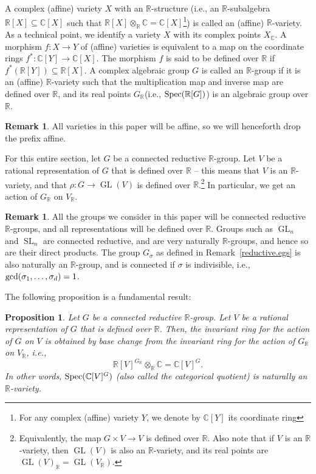 \documentclass[11pt]{amsart}
\newtheorem{proposition}[theorem]{Proposition}
\theoremstyle{definition}
\newtheorem{remark}[theorem]{Remark}
\newcommand{\R}{{\mathbb R}}
\newcommand{\C}{{\mathbb C}}
\newcommand{\GL}{\operatorname{GL}}
\newcommand{\SL}{\operatorname{SL}}
\begin{document}
A complex (affine) variety $X$ with an $\R$-structure (i.e., an $\R$-subalgebra $\R[X] \subseteq \C[X]$ such that $\R[X] \otimes_\R \C = \C[X]$\footnote{For any complex (affine) variety $Y$, we denote by $\C[Y]$ its coordinate ring}) is called an (affine) $\R$-variety. As a technical point, we identify a variety $X$ with its complex points $X_\C$. A morphism $f:X \rightarrow Y$ of (affine) varieties is equivalent to a map on the coordinate rings $f^*: \C[Y] \rightarrow \C[X]$. The morphism $f$ is said to be defined over $\R$ if $f^*(\R[Y]) \subseteq \R[X]$. A complex algebraic group $G$ is called an $\R$-group if it is an (affine) $\R$-variety such that the multiplication map and inverse map are defined over $\R$, and its real points $G_\R$(i.e., ${\rm Spec}(\R[G])$) is an algebraic group over $\R$.

\begin{remark}
All varieties in this paper will be affine, so we will henceforth drop the prefix affine.
\end{remark}

For this entire section, let $G$ be a connected reductive $\R$-group. Let $V$ be a rational representation of $G$ that is defined over $\R$ -- this means that $V$ is an $\R$-variety, and that $\rho: G \rightarrow \GL(V)$ is defined over $\R$.\footnote{Equivalently, the map $G \times V \rightarrow V$ is defined over $\R$. Also note that if $V$ is an $\R$-variety, then $\GL(V)$ is also an $\R$-variety, and its real points are $\GL(V)_\R = \GL(V_\R)$.} In particular, we get an action of $G_\R$ on $V_\R$.

\begin{remark}
All the groups we consider in this paper will be connected reductive $\R$-groups, and all representations will be defined over $\R$. Groups such as $\GL_n$ and $\SL_n$ are connected reductive, and are very naturally $\R$-groups, and hence so are their direct products. The group $G_\sigma$ as defined in Remark~\ref{reductive.egs} is also naturally an $\R$-group, and is connected if $\sigma$ is indivisible, i.e., ${\rm gcd}(\sigma_1,\dots,\sigma_d) = 1$.
\end{remark}

The following proposition is a fundamental result:

\begin{proposition} \label{inv.base.change}
Let $G$ be a connected reductive $\R$-group. Let $V$ be a rational representation of $G$ that is defined over $\R$. Then, the invariant ring for the action of $G$ on $V$ is obtained by base change from the invariant ring for the action of $G_\R$ on $V_\R$, i.e.,
$$
\R[V]^{G_\R} \otimes_\R \C = \C[V]^G.
$$
In other words, ${\rm Spec}(\C[V]^G)$ (also called the categorical quotient) is naturally an $\R$-variety.
\end{proposition}
\end{document}
